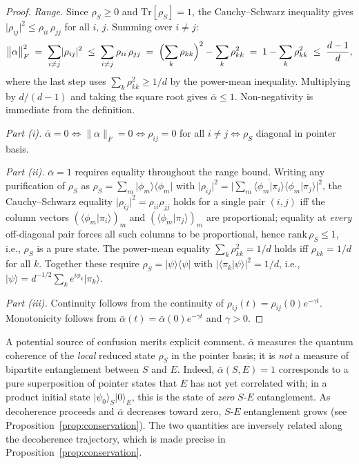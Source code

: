 \begin{proof}
\emph{Range.}
Since $\rho_S \geq 0$ and $\mathrm{Tr}[\rho_S] = 1$, the Cauchy--Schwarz
inequality gives
$\lvert\rho_{ij}\rvert^2 \leq \rho_{ii}\,\rho_{jj}$ for all $i,\,j$.
Summing over $i \neq j$:
\begin{equation*}
  \bigl\lVert\alpha\bigr\rVert_F^2
  \;=\; \sum_{i\neq j}\lvert\rho_{ij}\rvert^2
  \;\leq\; \sum_{i\neq j}\rho_{ii}\,\rho_{jj}
  \;=\; \Bigl(\sum_k\rho_{kk}\Bigr)^2 - \sum_k\rho_{kk}^2
  \;=\; 1 - \sum_k\rho_{kk}^2
  \;\leq\; \frac{d-1}{d},
\end{equation*}
where the last step uses $\sum_k\rho_{kk}^2 \geq 1/d$ by the
power-mean inequality.
Multiplying by $d/(d-1)$ and taking the square root gives
$\bar{\alpha} \leq 1$.
Non-negativity is immediate from the definition.

\emph{Part (i).}
$\bar{\alpha} = 0 \Leftrightarrow \lVert\alpha\rVert_F = 0
\Leftrightarrow \rho_{ij} = 0$ for all $i \neq j
\Leftrightarrow \rho_S$ diagonal in pointer basis.

\emph{Part (ii).}
$\bar{\alpha} = 1$ requires equality throughout the range bound.
Writing any purification of $\rho_S$ as
$\rho_S = \sum_m\vert\phi_m\rangle\langle\phi_m\vert$ with
$\lvert\rho_{ij}\rvert^2
  = \bigl\lvert\sum_m\overline{\langle\phi_m\vert\pi_i\rangle}
                       \langle\phi_m\vert\pi_j\rangle\bigr\rvert^2$,
the Cauchy--Schwarz equality
$\lvert\rho_{ij}\rvert^2 = \rho_{ii}\rho_{jj}$ holds for a single pair
$(i,j)$ iff the column vectors
$(\langle\phi_m\vert\pi_i\rangle)_m$ and
$(\langle\phi_m\vert\pi_j\rangle)_m$ are proportional;
equality at \emph{every} off-diagonal pair forces all such columns to be
proportional, hence $\mathrm{rank}\,\rho_S \leq 1$, i.e., $\rho_S$ is a
pure state.
The power-mean equality $\sum_k\rho_{kk}^2 = 1/d$ holds iff
$\rho_{kk} = 1/d$ for all $k$.
Together these require $\rho_S = \vert\psi\rangle\langle\psi\vert$
with $\lvert\langle\pi_k\vert\psi\rangle\rvert^2 = 1/d$, i.e.,
$\vert\psi\rangle = d^{-1/2}\sum_k e^{i\phi_k}\vert\pi_k\rangle$.

\emph{Part (iii).}
Continuity follows from the continuity of $\rho_{ij}(t) = \rho_{ij}(0)e^{-\gamma t}$.
Monotonicity follows from $\bar{\alpha}(t) = \bar{\alpha}(0)e^{-\gamma t}$
and $\gamma > 0$.
\end{proof}

\begin{remark}
\label{rem:affinity-vs-entanglement}
A potential source of confusion merits explicit comment.
$\bar{\alpha}$ measures the quantum coherence of the \emph{local}
reduced state $\rho_S$ in the pointer basis; it is \emph{not}
a measure of bipartite entanglement between $S$ and $E$.
Indeed, $\bar{\alpha}(S,E) = 1$ corresponds to a pure superposition of
pointer states that $E$ has not yet correlated with; in a product initial state $\vert\psi_0\rangle_S\vert 0\rangle_E$, this is the
state of \emph{zero} $S$-$E$ entanglement.
As decoherence proceeds and $\bar{\alpha}$ decreases toward zero,
$S$-$E$ entanglement grows (see Proposition~\ref{prop:conservation}).
The two quantities are inversely related along the decoherence
trajectory, which is made precise in Proposition~\ref{prop:conservation}.
\end{remark}

